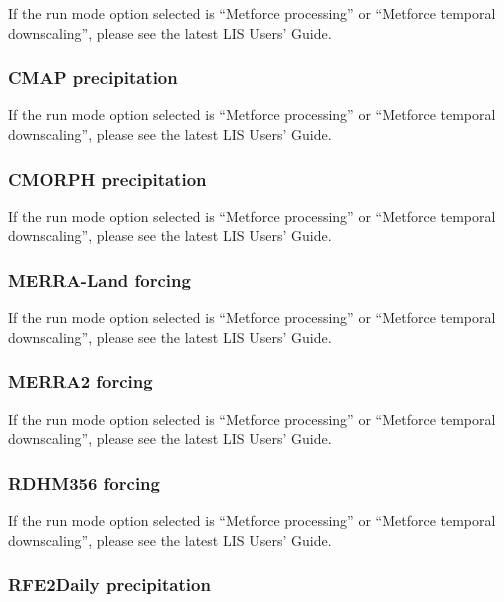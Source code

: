  If the run mode option selected is ``Metforce processing'' or
 ``Metforce temporal downscaling'', please see the latest LIS Users'
 Guide.

 

 
 \subsubsection{CMAP precipitation}

 If the run mode option selected is ``Metforce processing'' or
 ``Metforce temporal downscaling'', please see the latest LIS Users'
 Guide.

 

 
 \subsubsection{CMORPH precipitation} 

 If the run mode option selected is ``Metforce processing'' or
 ``Metforce temporal downscaling'', please see the latest LIS Users'
 Guide.

 

 
 \subsubsection{MERRA-Land forcing}

 If the run mode option selected is ``Metforce processing'' or
 ``Metforce temporal downscaling'', please see the latest LIS Users'
 Guide.

 

 
 \subsubsection{MERRA2 forcing}

 If the run mode option selected is ``Metforce processing'' or
 ``Metforce temporal downscaling'', please see the latest LIS Users'
 Guide.

 

 
 \subsubsection{RDHM356 forcing} 

 If the run mode option selected is ``Metforce processing'' or
 ``Metforce temporal downscaling'', please see the latest LIS Users'
 Guide.

 

 
 \subsubsection{RFE2Daily precipitation} 

